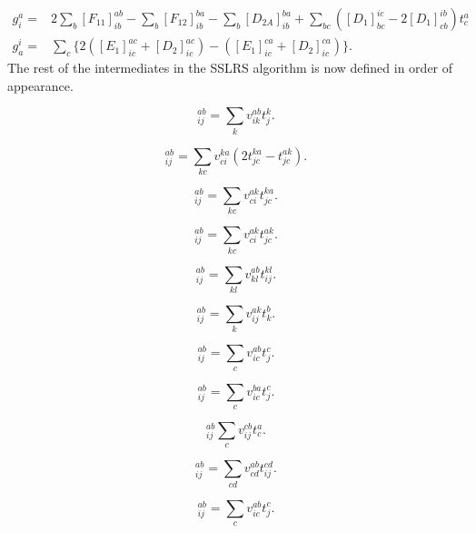 \documentclass[a4paper,norsk,11pt,twoside]{report}
\begin{document}
\begin{align}
g_i^a = & 
2 \sum_b [F_{11}]_{ib}^{ab} 
- \sum_b [F_{12}]_{ib}^{ba}
- \sum_b [D_{2A}]_{ib}^{ba}
+ \sum_{bc} (
[D_1]_{bc}^{ic} - 2[D_1]_{cb}^{ib} ) t_c^a
\\
g_a^i = &
\sum_c \{2([E_1]_{ic}^{ac} + [D_2]_{ic}^{ac} )
- ([E_1]_{ic}^{ca} + [D_2]_{ic}^{ca}) \} .
\end{align}
The rest of the intermediates in the SSLRS algorithm is now defined in order of appearance. 

\begin{equation}
[D_1]_{ij}^{ab} = \sum_k v_{ik}^{ab} t_j^k .
\end{equation}

\begin{equation}
[D_{2A}]_{ij}^{ab} = \sum_{kc}
v_{ci}^{ka} (2 t_{jc}^{ka} - t_{jc}^{ak}) .
\end{equation}

\begin{equation}
[D_{2B}]_{ij}^{ab} = \sum_{kc}
v_{ci}^{ak} t_{jc}^{ka} .
\end{equation}

\begin{equation}
[D_{2C}]_{ij}^{ab} = \sum_{kc}
v_{ci}^{ak} t_{jc}^{ak} .
\end{equation}

\begin{equation}
[B_2]_{ij}^{ab} = \sum_{kl} v_{kl}^{ab} t_{ij}^{kl} .
\end{equation}

\begin{equation}
[E_1^*]_{ij}^{ab} = \sum_k v_{ij}^{ak} t_k^b .
\end{equation}

\begin{equation}
[F_{12}]_{ij}^{ab} = \sum_c
v_{ic}^{ab} t_j^c .
\end{equation}

\begin{equation}
[F_{11}]_{ij}^{ab} = \sum_c v_{ic}^{ba} t_j^c .
\end{equation}

\begin{equation}
[E_{11}]_{ij}^{ab} \sum_c v_{ij}^{cb} t_c^a .
\end{equation}

\begin{equation}
[D_2]_{ij}^{ab} = \sum_{cd} v_{cd}^{ab} t_{ij}^{cd} .
\end{equation}

\begin{equation}
[E_1]_{ij}^{ab} = \sum_c v_{ic}^{ab} t_j^c .
\end{equation}
\end{document}

